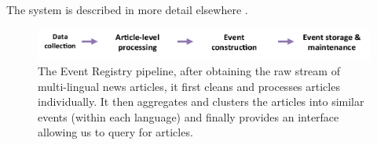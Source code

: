 \documentclass[twoside,11pt]{article}
\begin{document}
 The system is described in more detail elsewhere .

\begin{figure}[tbp]
\centering
\includegraphics[width=\textwidth]{ev_pipeline}
\caption{\label{fig:erpipeline}  The Event Registry pipeline, after obtaining the raw stream of multi-lingual news articles, it first cleans and processes articles individually. It then aggregates and clusters the articles into similar events (within each language) and finally provides an interface allowing us to query for articles.}
\end{figure}

\end{document}
